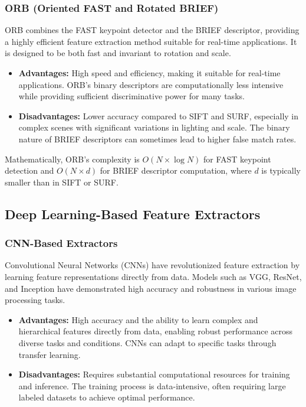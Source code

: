 \subsubsection{ORB (Oriented FAST and Rotated BRIEF)}
ORB combines the FAST keypoint detector and the BRIEF descriptor, providing a highly efficient feature extraction method suitable for real-time applications. It is designed to be both fast and invariant to rotation and scale.
\begin{itemize}
    \item \textbf{Advantages:} High speed and efficiency, making it suitable for real-time applications. ORB's binary descriptors are computationally less intensive while providing sufficient discriminative power for many tasks.
    \item \textbf{Disadvantages:} Lower accuracy compared to SIFT and SURF, especially in complex scenes with significant variations in lighting and scale. The binary nature of BRIEF descriptors can sometimes lead to higher false match rates.
\end{itemize}

Mathematically, ORB's complexity is $O(N \times \log N)$ for FAST keypoint detection and $O(N \times d)$ for BRIEF descriptor computation, where $d$ is typically smaller than in SIFT or SURF.

\subsection{Deep Learning-Based Feature Extractors}
\subsubsection{CNN-Based Extractors}
Convolutional Neural Networks (CNNs) have revolutionized feature extraction by learning feature representations directly from data. Models such as VGG, ResNet, and Inception have demonstrated high accuracy and robustness in various image processing tasks.
\begin{itemize}
    \item \textbf{Advantages:} High accuracy and the ability to learn complex and hierarchical features directly from data, enabling robust performance across diverse tasks and conditions. CNNs can adapt to specific tasks through transfer learning.
    \item \textbf{Disadvantages:} Requires substantial computational resources for training and inference. The training process is data-intensive, often requiring large labeled datasets to achieve optimal performance.
\end{itemize}

